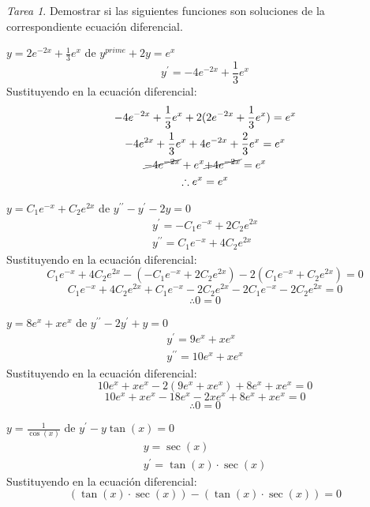 \documentclass[12pt]{article} %
\theoremstyle{remark} %
\newtheorem{tarea}{Tarea}[section] %
\newcounter{ejercicio}[tarea]
\newcommand{\ed}{ecuación diferencial}
\begin{document}
\begin{tarea}\label{tarea:soluciones}
  Demostrar si las siguientes funciones son soluciones de la correspondiente ecuación diferencial.\\
  \begin{ejercicio}[2]
  $y = 2e^{-2x} + \frac{1}{3} e^x$ de $y^{prime} + 2y = e^x$
    \[ y^{\prime} = -4e^{-2x} + \frac{1}{3} e^x \]
    Sustituyendo en la \ed:
    \begin{gather*}
      -4e^{-2x} + \frac{1}{3} e^x + 2(2e^{-2x} + \frac{1}{3} e^x) = e^x\\
      -4e^{2x} + \frac{1}{3} e^x + 4e^{-2x} + \frac{2}{3} e^x = e^x\\
      \cancel{-4e^{-2x}} + e^x \cancel{+ 4e^{-2x}} = e^x\\
      \therefore e^x = e^x
    \end{gather*}
  \end{ejercicio}
  \begin{ejercicio}[4]
    $y = C_1 e^{-x} + C_2 e^{2x}$ de $y^{\prime \prime} - y^{\prime} -2y = 0$
    \begin{gather*}
      y^{\prime} = -C_1 e^{-x} + 2C_2e^{2x}\\
      y^{\prime \prime} = C_1e^{-x} + 4C_2e^{2x}
    \end{gather*}
    Sustituyendo en la \ed :
    \[ C_1e^{-x} + 4C_2e^{2x} - (-C_1e^{-x} + 2C_2e^{2x}) - 2(C_1e^{-x} + C_2e^{2x}) = 0 \]
    \[ C_1e^{-x} + 4C_2e^{2x} + C_1e^{-x} - 2C_2e^{2x} - 2C_1e^{-x} -2C_2e^{2x} = 0 \]
    \[ \therefore 0 = 0 \]
  \end{ejercicio}
  \begin{ejercicio}[5]
    $y = 8e^x + xe^x$ de $y^{\prime \prime} - 2y^{\prime} + y = 0$
    \begin{gather*}
      y^{\prime} = 9e^x + xe^x\\
      y^{\prime \prime} = 10e^x + xe^x
    \end{gather*}
    Sustituyendo en la \ed :
    \[ 10e^x + xe^x - 2(9e^x + xe^x) + 8e^x + xe^x = 0 \]
    \[ 10e^x + xe^x - 18e^x - 2xe^x + 8e^x + xe^x = 0 \]
    \[ \therefore 0 = 0 \]
  \end{ejercicio}
  \begin{ejercicio}[7]
    $y = \frac{1}{\cos(x)}$ de $y^{\prime} - y \tan(x) = 0$
    \begin{gather*}
      y = \sec(x)\\
      y^{\prime} = \tan(x) \cdot \sec(x)
    \end{gather*}
    Sustituyendo en la \ed :
    \[ (\tan(x) \cdot \sec(x)) - (\tan(x) \cdot \sec(x)) = 0\]

\end{ejercicio}
\end{tarea}
\end{document}

